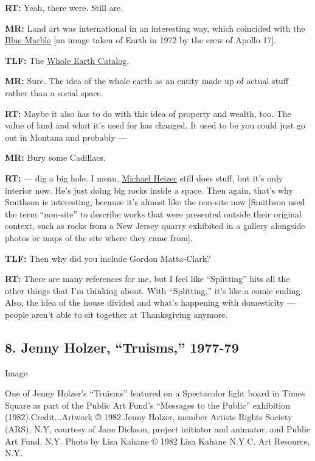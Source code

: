 \textbf{RT:} Yeah, there were. Still are.

\textbf{MR:} Land art was international in an interesting way, which
coincided with the
\href{https://www.nytimes.com/interactive/projects/cp/summer-of-science-2015/latest/blue-marble-earth-photos-comparison}{Blue
Marble} {[}an image taken of Earth in 1972 by the crew of Apollo 17{]}.

\textbf{TLF:} The
\href{https://www.nytimes.com/1974/11/08/archives/-whole-earth-catalog-recycled-as-epilog-new-group-to-serve.html}{Whole
Earth Catalog}.

\textbf{MR:} Sure. The idea of the whole earth as an entity made up of
actual stuff rather than a social space.

\textbf{RT:} Maybe it also has to do with this idea of property and
wealth, too. The value of land and what it's used for has changed. It
used to be you could just go out in Montana and probably ---

\textbf{MR:} Bury some Cadillacs.

\textbf{RT:} --- dig a big hole. I mean,
\href{https://www.nytimes.com/2015/05/17/arts/design/michael-heizers-big-work-and-long-view.html}{Michael
Heizer} still does stuff, but it's only interior now. He's just doing
big rocks inside a space. Then again, that's why Smithson is
interesting, because it's almost like the non-site now {[}Smithson used
the term ``non-site'' to describe works that were presented outside
their original context, such as rocks from a New Jersey quarry exhibited
in a gallery alongside photos or maps of the site where they came
from{]}.

\textbf{TLF:} Then why did you include Gordon Matta-Clark?

\textbf{RT:} There are many references for me, but I feel like
``Splitting'' hits all the other things that I'm thinking about. With
``Splitting,'' it's like a comic ending. Also, the idea of the house
divided and what's happening with domesticity --- people aren't able to
sit together at Thanksgiving anymore.

\hypertarget{8-jenny-holzer-truisms-1977-79}{%
\subsection{8. Jenny Holzer, ``Truisms,''
1977-79}\label{8-jenny-holzer-truisms-1977-79}}

Image

One of Jenny Holzer's ``Truisms'' featured on a Spectacolor light board
in Times Square as part of the Public Art Fund's ``Messages to the
Public'' exhibition (1982).Credit...Artwork © 1982 Jenny Holzer, member
Artists Rights Society (ARS), N.Y, courtesy of Jane Dickson, project
initiator and animator, and Public Art Fund, N.Y. Photo by Lisa Kahane ©
1982 Lisa Kahane N.Y.C. Art Resource, N.Y.

